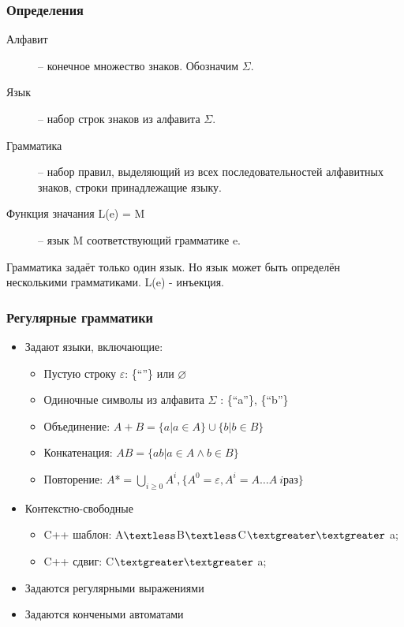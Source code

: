 \documentclass[16pt,pdf,unicode]{beamer}
\begin{document}
\begin{frame}
  \frametitle{Определения}
  \begin{description}
  \item[Алфавит] -- конечное множество знаков. Обозначим $\Sigma$.
  \item[Язык] -- набор строк знаков из алфавита $\Sigma$.
  \item[Грамматика] -- набор правил, выделяющий из всех последовательностей алфавитных знаков,
    строки принадлежащие языку.
  \item[Функция значания L(e) = M] -- язык M соответствующий грамматике e.
  \end{description}
  \begin{block}{}
    Грамматика задаёт только один язык. Но язык может быть определён несколькими грамматиками.
    L(e) - инъекция.
  \end{block}
\end{frame}

\begin{frame}
  \frametitle{Регулярные грамматики}
  \begin{itemize}
  \item Задают языки, включающие:
    \begin{itemize}
      \item Пустую строку $\varepsilon$: \{``''\} или $\varnothing$
      \item Одиночные символы из алфавита $\Sigma$ : \{``a''\}, \{``b''\}
      \item Объединение: $A + B = \{a | a\in A\} \cup \{b | b\in B\}$
      \item Конкатенация: $AB = \{ab | a\in A \wedge b\in B\}$
      \item Повторение: $A$*$ = \bigcup\limits_{i\geq0}A^i, \{A^0=\varepsilon, A^i={A\dotso A}\ i$раз$\}$
    \end{itemize}
  \item Контекстно-свободные
    \begin{itemize}
    \item C++ шаблон: A$\textless$B$\textless$C$\textgreater \textgreater$ a;
    \item C++ сдвиг:  C$\textgreater \textgreater$ a;
    \end{itemize}
  \item Задаются регулярными выражениями
  \item Задаются кончеными автоматами
  \end{itemize}
\end{frame}
\end{document}
